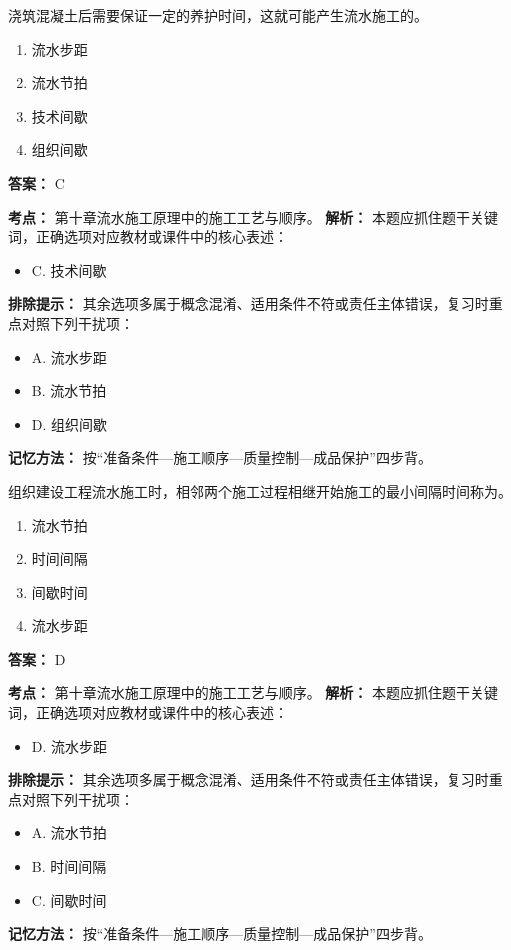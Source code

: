 \documentclass[UTF8,fontset=fandol,11pt]{ctexart}
\begin{document}
\begin{quizbox}[title={第 7 题}]
浇筑混凝土后需要保证一定的养护时间，这就可能产生流水施工的。\\
\begin{enumerate}[label=\Alph*.]
\item 流水步距
\item 流水节拍
\item 技术间歇
\item 组织间歇
\end{enumerate}
\textbf{答案：} C
\vspace{0.25em}
\begin{answerbox}[title={考点解析}]
\textbf{考点：} 第十章流水施工原理中的施工工艺与顺序。
\textbf{解析：} 本题应抓住题干关键词，正确选项对应教材或课件中的核心表述：
\begin{itemize}
\item C. 技术间歇
\end{itemize}
\textbf{排除提示：} 其余选项多属于概念混淆、适用条件不符或责任主体错误，复习时重点对照下列干扰项：
\begin{itemize}
\item A. 流水步距
\item B. 流水节拍
\item D. 组织间歇
\end{itemize}
\textbf{记忆方法：} 按“准备条件—施工顺序—质量控制—成品保护”四步背。
\end{answerbox}
\end{quizbox}

\begin{quizbox}[title={第 8 题}]
组织建设工程流水施工时，相邻两个施工过程相继开始施工的最小间隔时间称为。\\
\begin{enumerate}[label=\Alph*.]
\item 流水节拍
\item 时间间隔
\item 间歇时间
\item 流水步距
\end{enumerate}
\textbf{答案：} D
\vspace{0.25em}
\begin{answerbox}[title={考点解析}]
\textbf{考点：} 第十章流水施工原理中的施工工艺与顺序。
\textbf{解析：} 本题应抓住题干关键词，正确选项对应教材或课件中的核心表述：
\begin{itemize}
\item D. 流水步距
\end{itemize}
\textbf{排除提示：} 其余选项多属于概念混淆、适用条件不符或责任主体错误，复习时重点对照下列干扰项：
\begin{itemize}
\item A. 流水节拍
\item B. 时间间隔
\item C. 间歇时间
\end{itemize}
\textbf{记忆方法：} 按“准备条件—施工顺序—质量控制—成品保护”四步背。
\end{answerbox}
\end{quizbox}
\end{document}
